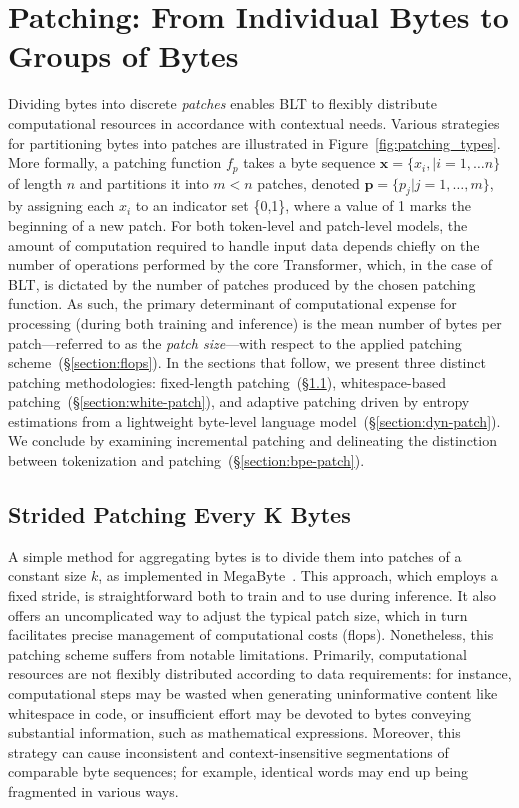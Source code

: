 \section{Patching: From Individual Bytes to Groups of Bytes}
\label{section:patching}

Dividing bytes into discrete \textit{patches} enables {\textsc BLT} to flexibly distribute computational resources in accordance with contextual needs. Various strategies for partitioning bytes into patches are illustrated in Figure~\ref{fig:patching_types}. More formally, a patching function $f_p$ takes a byte sequence $\pmb{x}=\{x_i,|i=1,\ldots n\}$ of length $n$ and partitions it into $m < n$ patches, denoted $\pmb{p}=\{p_j|j=1,\ldots,m\}$, by assigning each $x_i$ to an indicator set \{0,1\}, where a value of 1 marks the beginning of a new patch. For both token-level and patch-level models, the amount of computation required to handle input data depends chiefly on the number of operations performed by the core Transformer, which, in the case of {\textsc BLT}, is dictated by the number of patches produced by the chosen patching function. As such, the primary determinant of computational expense for processing (during both training and inference) is the mean number of bytes per patch—referred to as the \textit{patch size}—with respect to the applied patching scheme~(\S\ref{section:flops}). In the sections that follow, we present three distinct patching methodologies: fixed-length patching~(\S\ref{section:static-patch}), whitespace-based patching~(\S\ref{section:white-patch}), and adaptive patching driven by entropy estimations from a lightweight byte-level language model~(\S\ref{section:dyn-patch}). We conclude by examining incremental patching and delineating the distinction between tokenization and patching~(\S\ref{section:bpe-patch}).

\subsection{Strided Patching Every K Bytes}
\label{section:static-patch}

A simple method for aggregating bytes is to divide them into patches of a constant size $k$, as implemented in MegaByte~\citep{yu2023megabyte}. This approach, which employs a fixed stride, is straightforward both to train and to use during inference. It also offers an uncomplicated way to adjust the typical patch size, which in turn facilitates precise management of computational costs (flops). Nonetheless, this patching scheme suffers from notable limitations. Primarily, computational resources are not flexibly distributed according to data requirements: for instance, computational steps may be wasted when generating uninformative content like whitespace in code, or insufficient effort may be devoted to bytes conveying substantial information, such as mathematical expressions. Moreover, this strategy can cause inconsistent and context-insensitive segmentations of comparable byte sequences; for example, identical words may end up being fragmented in various ways.

